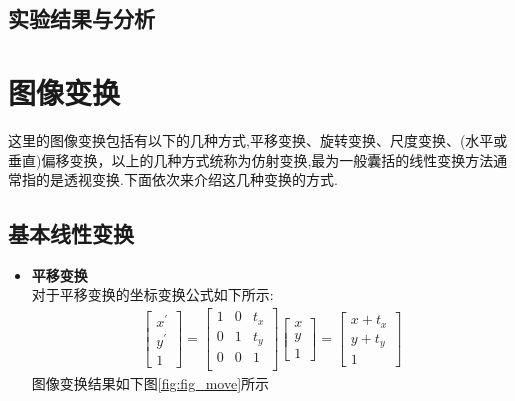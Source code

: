 \documentclass[UTF8,a4paper,10pt]{ctexart}
\begin{document}
\begin{flushleft}
        \subsection{实验结果与分析}

        \section{图像变换}
        \hspace{2em}这里的图像变换包括有以下的几种方式,平移变换、旋转变换、尺度变换、(水平或垂直)偏移变换，以上的几种方式统称为仿射变换,最为一般囊括的线性变换方法通常指的是透视变换.下面依次来介绍这几种变换的方式.
        \subsection{基本线性变换}
        \begin{itemize}
            \item \textbf{平移变换}\\
            \hspace{2em}对于平移变换的坐标变换公式如下所示:
            \begin{eqnarray}
                \left[\begin{array}{c}
                    x^{\prime}\\
                    y^{\prime}\\
                    1
                \end{array}\right]=\left[\begin{array}{ccc}
                    1 & 0 & t_{x}\\
                    0 & 1 & t_{y}\\
                    0 & 0 & 1\\
                \end{array}\right]\left[\begin{array}{c}
                    x\\
                    y\\
                    1
                \end{array}\right]=\left[\begin{array}{c}
                    x+t_{x}\\
                    y+t_{y}\\
                    1
                \end{array}\right]\nonumber
            \end{eqnarray}
            \hspace{2em}图像变换结果如下图\ref{fig:fig_move}所示

\end{itemize}
\end{flushleft}
\end{document}
